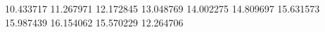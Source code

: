 10.433717
11.267971
12.172845
13.048769
14.002275
14.809697
15.631573
15.987439
16.154062
15.570229
12.264706
